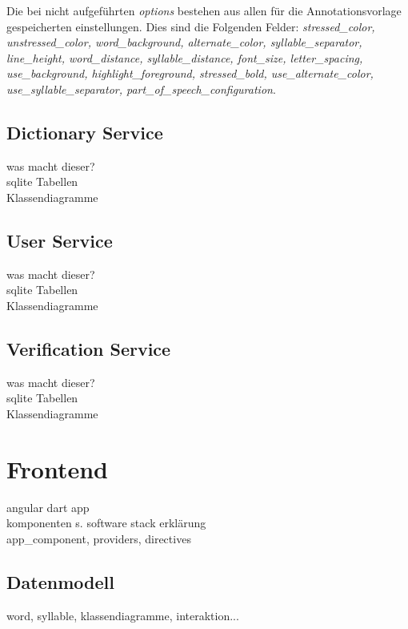 Die bei  nicht aufgeführten \textit{options} bestehen aus allen für die Annotationsvorlage gespeicherten einstellungen. Dies sind die Folgenden Felder: \textit{stressed\_color, unstressed\_color, word\_background, alternate\_color, syllable\_separator, line\_height, word\_distance, syllable\_distance, font\_size, letter\_spacing, use\_background, highlight\_foreground, stressed\_bold, use\_alternate\_color, use\_syllable\_separator, part\_of\_speech\_configuration}.

\subsection{Dictionary Service}

was macht dieser?\\
sqlite Tabellen\\
Klassendiagramme\\

\subsection{User Service}
was macht dieser?\\
sqlite Tabellen\\
Klassendiagramme\\

\subsection{Verification Service}
was macht dieser?\\
sqlite Tabellen\\
Klassendiagramme\\


\section{Frontend}

angular dart app\\
komponenten s. software stack erklärung\\

app\_component, providers, directives\\

\subsection{Datenmodell}
word, syllable, klassendiagramme, interaktion...

